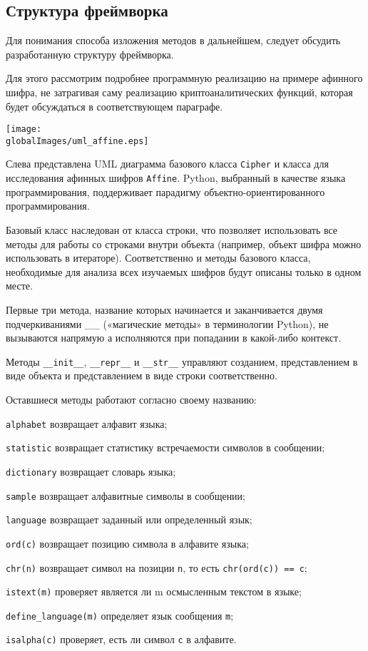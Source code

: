\subsection{Структура фреймворка}

Для понимания способа изложения методов в дальнейшем, 
следует обсудить разработанную структуру фреймворка.

Для этого
рассмотрим подробнее программную реализацию на примере афинного
шифра, не затрагивая саму реализацию криптоаналитических
функций, которая будет обсуждаться в соответствующем
параграфе.

\vspace{3mm}
\noindent
\parbox[b][8.5cm][t]{10mm}{
    \texttt{[image: \\globalImages/uml\_affine.eps]}
}
\hfill
\parbox[b][8.5cm][t]{107mm}{
    Слева представлена UML диаграмма базового класса \texttt{Cipher} и 
    класса для исследования афинных шифров \texttt{Affine}. Python, выбранный 
    в качестве языка программирования, поддерживает
    парадигму объектно-ориентированного программирования. 

    Базовый класс наследован от класса строки, что позволяет 
    использовать все методы для работы со строками внутри 
    объекта (например, объект шифра можно использовать в 
    итераторе). Соответственно и методы базового класса, 
    необходимые для анализа всех изучаемых шифров будут 
    описаны только в одном месте.

    Первые три метода, название которых начинается и 
    заканчивается двумя подчеркиваниями \_\_ («магические
    методы» в терминологии Python), не вызываются напрямую
    а исполняются при попадании в какой-либо контекст. 
}

Методы 
\texttt{\_\_init\_\_}, \texttt{\_\_repr\_\_} и \texttt{\_\_str\_\_}
управляют созданием, представлением в виде объекта и представлением в виде
строки соответственно.

Оставшиеся методы работают согласно своему названию:

\begin{trivlist}
\item \texttt{alphabet} возвращает алфавит языка;
\item \texttt{statistic} возвращает статистику встречаемости символов в сообщении;
\item \texttt{dictionary} возвращает словарь языка;
\item \texttt{sample} возвращает алфавитные символы в сообщении;
\item \texttt{language} возвращает заданный или определенный язык;
\item \texttt{ord(c)} возвращает позицию символа в алфавите языка;
\item \texttt{chr(n)} возвращает символ на позиции \texttt{n}, то есть \texttt{chr(ord(c)) == c};
\item \texttt{istext(m)} проверяет является ли m осмысленным текстом в языке;
\item \texttt{define\_language(m)} определяет язык сообщения \texttt{m};
\item \texttt{isalpha(c)} проверяет, есть ли символ \texttt{с} в алфавите.
\end{trivlist}

